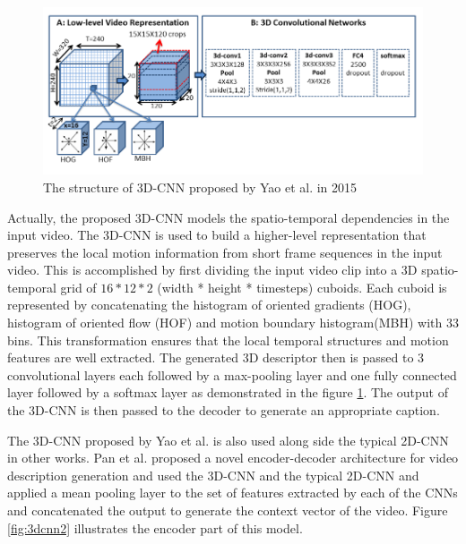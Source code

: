 \documentclass[preprint, 10pt]{elsarticle}
\begin{document}
		\begin{figure}[h]
			\centering
			\includegraphics[scale=0.5]{Imgs/3DCNN.png}
			\caption{The structure of 3D-CNN proposed by Yao et al. in 2015 \cite{yao2015describing}}
			\label{fig:3dcnn}
		\end{figure}
	
		Actually, the proposed 3D-CNN models the spatio-temporal dependencies in the input video. The 3D-CNN is used to build a higher-level representation that preserves the local motion information from short frame sequences in the input video. This is accomplished by first dividing the input video clip into a 3D spatio-temporal grid of $16 * 12 * 2$ (width * height * timesteps) cuboids. Each cuboid is represented by concatenating the histogram of oriented gradients (HOG), histogram of oriented flow (HOF) and motion boundary histogram(MBH) with 33 bins. This transformation ensures that the local temporal structures and motion features are well extracted. The generated 3D descriptor then is passed to 3 convolutional layers each followed by a max-pooling layer and one fully connected layer followed by a softmax layer as demonstrated in the figure \ref{fig:3dcnn}. The output of the 3D-CNN is then passed to the decoder to generate an appropriate caption.
		
		The 3D-CNN proposed by Yao et al. \cite{yao2015describing} is also used along side the typical 2D-CNN in other works. Pan et al. \cite{pan2016jointly} proposed a novel encoder-decoder architecture for video description generation and used the 3D-CNN and the typical 2D-CNN and applied a mean pooling layer to the set of features extracted by each of the CNNs and concatenated the output to generate the context vector of the video. Figure \ref{fig:3dcnn2} illustrates the encoder part of this model.
		
\end{document}

